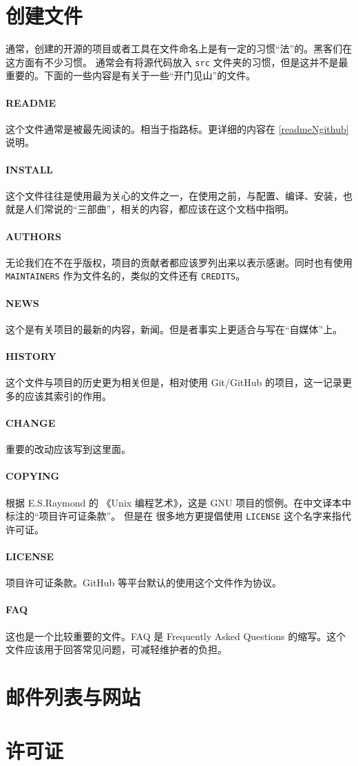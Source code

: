 \documentclass{ctexart}
\begin{document}
\section{创建文件}
通常，创建的开源的项目或者工具在文件命名上是有一定的习惯“法”的。黑客们在这方面有不少习惯。
通常会有将源代码放入 \verb|src| 文件夹的习惯，但是这并不是最重要的。下面的一些内容是有关于一些“开门见山”的文件。
\paragraph{README}
这个文件通常是被最先阅读的。相当于指路标。更详细的内容在 \ref{readmeNgithub} 说明。
\paragraph{INSTALL}
这个文件往往是使用最为关心的文件之一，在使用之前，与配置、编译、安装，也就是人们常说的“三部曲”，相关的内容，都应该在这个文档中指明。
\paragraph{AUTHORS}
无论我们在不在乎版权，项目的贡献者都应该罗列出来以表示感谢。同时也有使用 \verb|MAINTAINERS| 作为文件名的，类似的文件还有 \verb|CREDITS|。
\paragraph{NEWS}
这个是有关项目的最新的内容，新闻。但是者事实上更适合与写在“自媒体”上。
\paragraph{HISTORY}
这个文件与项目的历史更为相关但是，相对使用 Git/GitHub 的项目，这一记录更多的应该其索引的作用。
\paragraph{CHANGE}
重要的改动应该写到这里面。
\paragraph{COPYING}
根据 E.S.Raymond 的 《Unix 编程艺术》，这是 GNU 项目的惯例。在中文译本中标注的“项目许可证条款”。
但是在 很多地方更提倡使用 \verb|LICENSE| 这个名字来指代许可证。
\paragraph{LICENSE}
项目许可证条款。GitHub 等平台默认的使用这个文件作为协议。
\paragraph{FAQ}
这也是一个比较重要的文件。FAQ 是 Frequently Asked Questions 的缩写。这个文件应该用于回答常见问题，可减轻维护者的负担。




\section{邮件列表与网站}

\section{许可证}
\end{document}
